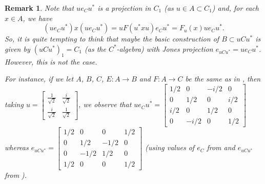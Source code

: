 \documentclass[a4]{amsart}
\newtheorem{remark}[theorem]{\bf Remark}
\numberwithin{equation}{section}
\begin{document}
\begin{remark} Note that $ue_Cu^*$ is a  projection in $C_1$ (as $u\in A\subset C_1$) and, for each $x \in A$, we have
 \[
(ue_Cu^*) x (ue_Cu^*)= uF(u^*xu)e_Cu^*=F_u(x)ue_Cu^*.
 \]
So, it is quite tempting to think that maybe    
   the basic construction of $B \subset uCu^*$ is given by $(uCu^*)_1 = C_1$ (as the $C^*$-algebra) with Jones projection   $e_{uCu^*} = ue_Cu^*$. However, this is not the case.    
   
   For instance, if we let $A$, $B$, $C$, $E: A\to B$ and $F: A \to C$ be the  same as in , then taking  $u= \begin{bmatrix}
   	 \frac{1}{\sqrt{2}} & \frac{i}{\sqrt{2}} \\ \frac{i}{\sqrt{2}} &
   	\frac{1}{\sqrt{2}}
   \end{bmatrix}$, we observe that $ue_Cu^* = \begin{bmatrix}
   1/2 & 0 & -i/2 & 0 \\ 0 & 1/2 & 0 & i/2 \\ i/2 & 0 & 1/2 & 0 \\ 0 & -i/2 & 0 & 1/2
\end{bmatrix}$ whereas $e_{uCu^*} = \begin{bmatrix}
1/2 & 0 & 0 & 1/2 \\ 0 & 1/2 & -1/2 & 0\\ 0 & -1/2 & 1/2 & 0 \\ 1/2 & 0 & 0 & 1/2
\end{bmatrix}$ (using values of $e_C$ from  and $e_{uCu^*}$ from ).

 \end{remark}


 
\end{document}

